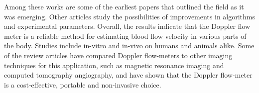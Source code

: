 Among these works are some of the earliest papers that outlined the field as it was emerging. Other articles study the possibilities of improvements in algorithms and experimental parameters. Overall, the results indicate that the Doppler flow meter is a reliable method for estimating blood flow velocity in various parts of the body. Studies include in-vitro and in-vivo on humans and animals alike. Some of the review articles have compared Doppler flow-meters to other imaging techniques for this application, such as magnetic resonance imaging and computed tomography angiography, and have shown that the Doppler flow-meter is a cost-effective, portable and non-invasive choice.
%

